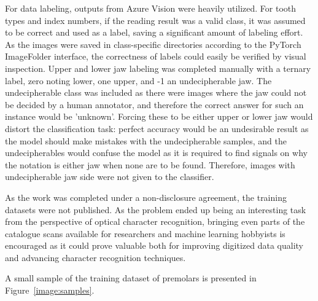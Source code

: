 \documentclass[english,twoside,openright]{UH_DS_MSc}
\begin{document}
For data labeling, outputs from Azure Vision were heavily utilized. For 
tooth types and index numbers, if the reading result was a valid class, it was assumed to 
be correct and used as a label, saving a significant amount of labeling effort. As the 
images were saved in class-specific directories according to the PyTorch ImageFolder interface,
the correctness of labels could easily be verified by visual inspection. Upper and lower jaw labeling 
was completed manually with a ternary label, zero noting lower, one upper, and -1 an undecipherable jaw.
The undecipherable class was included as there were images where the jaw could not be decided by a human annotator, 
and therefore the correct answer for such an instance would be 'unknown'. Forcing these to be either upper or lower jaw 
would distort the classification task: perfect accuracy would be an undesirable result as the model should 
make mistakes with the undecipherable samples, and the undecipherables would confuse the model as it is required to find signals on why 
the notation is either jaw when none are to be found. Therefore, images with undecipherable jaw side were not given 
to the classifier.

As the work was completed under a non-disclosure agreement, the training datasets were not 
published. As the problem ended up being an interesting task from the perspective of optical character recognition, 
bringing even parts of the catalogue scans available for researchers and machine learning hobbyists is encouraged as it could prove
 valuable both for improving digitized data quality and advancing character recognition techniques.
 
A small sample of the training dataset of premolars is presented in Figure~\ref{image:samples}.
\end{document}
